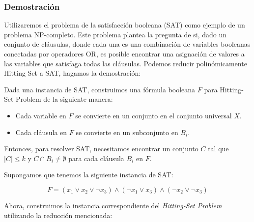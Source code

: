 \documentclass{estilo}
\begin{document}
\newpage
\subsubsection{Demostración}

Utilizaremos el problema de la satisfacción booleana (SAT) como ejemplo de un problema NP-completo. Este problema plantea la pregunta de si, dado un conjunto de cláusulas, donde cada una es una combinación de variables booleanas conectadas por operadores OR, es posible encontrar una asignación de valores a las variables que satisfaga todas las cláusulas. Podemos reducir polinómicamente Hitting Set a SAT, hagamos la demostración:

Dada una instancia de SAT, construimos una fórmula booleana \(F\) para Hitting-Set Problem de la siguiente manera:

\begin{itemize}
    \item Cada variable en \(F\) se convierte en un conjunto en el conjunto universal \(X\).
    \item Cada cláusula en \(F\) se convierte en un subconjunto en \(B_i\).
\end{itemize}

Entonces, para resolver SAT, necesitamos encontrar un conjunto \(C\) tal que \(|C| \leq k\) y \(C \cap B_i \neq \emptyset\) para cada cláusula \(B_i\) en \(F\).

Supongamos que tenemos la siguiente instancia de SAT:

\[ F = (x_1 \lor x_2 \lor \neg x_3) \land (\neg x_1 \lor x_3) \land (\neg x_2 \lor \neg x_3) \]

Ahora, construimos la instancia correspondiente del \textit{Hitting-Set Problem} utilizando la reducción mencionada:
\end{document}

